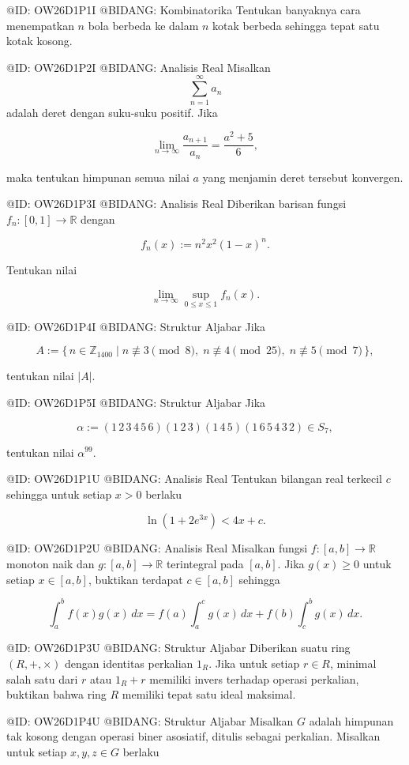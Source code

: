 @ID: OW26D1P1I
@BIDANG: Kombinatorika
Tentukan banyaknya cara menempatkan $n$ bola berbeda ke dalam $n$ kotak berbeda sehingga tepat satu kotak kosong.

@ID: OW26D1P2I
@BIDANG: Analisis Real
Misalkan
$$
\sum_{n=1}^{\infty} a_n
$$
adalah deret dengan suku-suku positif. Jika

$$
\lim_{n\to\infty}\frac{a_{n+1}}{a_n}
=
\frac{a^2+5}{6},
$$

maka tentukan himpunan semua nilai $a$ yang menjamin deret tersebut konvergen.

@ID: OW26D1P3I
@BIDANG: Analisis Real
Diberikan barisan fungsi $f_n:[0,1]\to\mathbb{R}$ dengan

$$
f_n(x):=n^2x^2(1-x)^n.
$$

Tentukan nilai

$$
\lim_{n\to\infty}
\sup_{0\le x\le1}
f_n(x).
$$

@ID: OW26D1P4I
@BIDANG: Struktur Aljabar
Jika

$$
A:=\{\,n\in\mathbb{Z}_{1400}\mid
n\not\equiv3\pmod8,\;
n\not\equiv4\pmod{25},\;
n\not\equiv5\pmod7
\,\},
$$

tentukan nilai $|A|$.

@ID: OW26D1P5I
@BIDANG: Struktur Aljabar
Jika

$$
\alpha:=(1\,2\,3\,4\,5\,6)(1\,2\,3)(1\,4\,5)(1\,6\,5\,4\,3\,2)\in S_7,
$$

tentukan nilai $\alpha^{99}.$

@ID: OW26D1P1U
@BIDANG: Analisis Real
Tentukan bilangan real terkecil $c$ sehingga untuk setiap $x>0$ berlaku

$$
\ln(1+2e^{3x})<4x+c.
$$

@ID: OW26D1P2U
@BIDANG: Analisis Real
Misalkan fungsi $f:[a,b]\to\mathbb{R}$ monoton naik dan $g:[a,b]\to\mathbb{R}$ terintegral pada $[a,b]$. Jika $g(x)\ge0$ untuk setiap $x\in[a,b]$, buktikan terdapat $c\in[a,b]$ sehingga

$$
\int_a^b f(x)g(x)\,dx
=
f(a)\int_a^c g(x)\,dx
+
f(b)\int_c^b g(x)\,dx.
$$

@ID: OW26D1P3U
@BIDANG: Struktur Aljabar
Diberikan suatu ring $(R,+,\times)$ dengan identitas perkalian $1_R$. Jika untuk setiap $r\in R$, minimal salah satu dari $r$ atau $1_R+r$ memiliki invers terhadap operasi perkalian, buktikan bahwa ring $R$ memiliki tepat satu ideal maksimal.

@ID: OW26D1P4U
@BIDANG: Struktur Aljabar
Misalkan $G$ adalah himpunan tak kosong dengan operasi biner asosiatif, ditulis sebagai perkalian. Misalkan untuk setiap $x,y,z\in G$ berlaku

